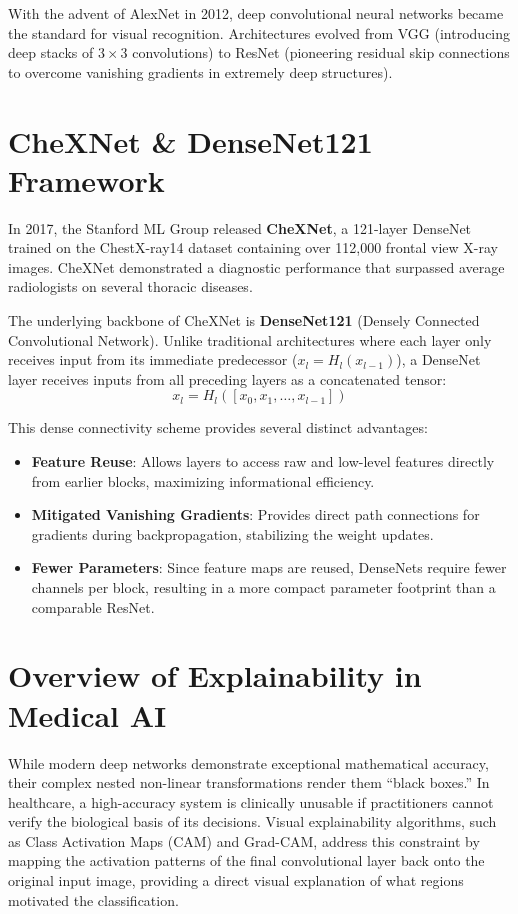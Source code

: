 \documentclass[12pt,oneside]{report}
\begin{document}
With the advent of AlexNet in 2012, deep convolutional neural networks became the standard for visual recognition. Architectures evolved from VGG (introducing deep stacks of $3\times3$ convolutions) to ResNet (pioneering residual skip connections to overcome vanishing gradients in extremely deep structures).

\section{CheXNet \& DenseNet121 Framework}
In 2017, the Stanford ML Group released \textbf{CheXNet}, a 121-layer DenseNet trained on the ChestX-ray14 dataset containing over 112,000 frontal view X-ray images. CheXNet demonstrated a diagnostic performance that surpassed average radiologists on several thoracic diseases.

The underlying backbone of CheXNet is \textbf{DenseNet121} (Densely Connected Convolutional Network). Unlike traditional architectures where each layer only receives input from its immediate predecessor ($x_l = H_l(x_{l-1})$), a DenseNet layer receives inputs from all preceding layers as a concatenated tensor:
\begin{equation}
x_l = H_l([x_0, x_1, \dots, x_{l-1}])
\end{equation}

This dense connectivity scheme provides several distinct advantages:
\begin{itemize}[label=\textbullet]
    \item \textbf{Feature Reuse}: Allows layers to access raw and low-level features directly from earlier blocks, maximizing informational efficiency.
    \item \textbf{Mitigated Vanishing Gradients}: Provides direct path connections for gradients during backpropagation, stabilizing the weight updates.
    \item \textbf{Fewer Parameters}: Since feature maps are reused, DenseNets require fewer channels per block, resulting in a more compact parameter footprint than a comparable ResNet.
\end{itemize}

\section{Overview of Explainability in Medical AI}
While modern deep networks demonstrate exceptional mathematical accuracy, their complex nested non-linear transformations render them ``black boxes.'' In healthcare, a high-accuracy system is clinically unusable if practitioners cannot verify the biological basis of its decisions. Visual explainability algorithms, such as Class Activation Maps (CAM) and Grad-CAM, address this constraint by mapping the activation patterns of the final convolutional layer back onto the original input image, providing a direct visual explanation of what regions motivated the classification.
\end{document}
